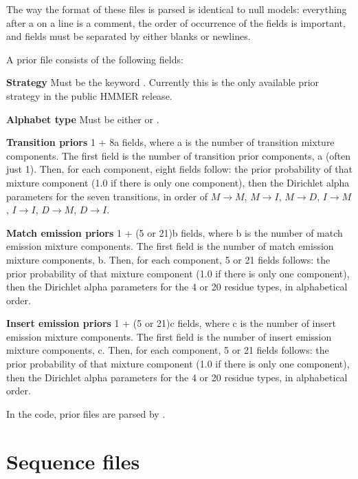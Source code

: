 The way the format of these files is parsed is identical to null
models: everything after a \prog{\#} on a line is a comment, the order
of occurrence of the fields is important, and fields must be separated
by either blanks or newlines.

A prior file consists of the following fields:

\begin{wideitem}
\item [\textbf{Strategy}] Must be the keyword . Currently 
this is the only available prior strategy in the public HMMER release.

\item [\textbf{Alphabet type}] Must be either  or
.

\item [\textbf{Transition priors}] 1 + 8a fields, where a
is the number of transition mixture components. The first field is the
number of transition prior components, a (often just 1). Then, for each
component, eight fields follow: the prior probability of that mixture
component (1.0 if there is only one component), then the Dirichlet
alpha parameters for the seven transitions, in order of $M \rightarrow
M$, $M \rightarrow I$, $M \rightarrow D$, $I \rightarrow M$, $I
\rightarrow I$, $D \rightarrow M$, $D \rightarrow I$.

\item [\textbf{Match emission priors}] 1 + (5 or 21)b fields,
where b is the number of match emission mixture components.  The first
field is the number of match emission mixture components, b. Then, for
each component, 5 or 21 fields follows: the prior probability of that
mixture component (1.0 if there is only one component), then the
Dirichlet alpha parameters for the 4 or 20 residue types, in
alphabetical order.

\item [\textbf{Insert emission priors}] 1 + (5 or 21)c fields,
where c is the number of insert emission mixture components.  The
first field is the number of insert emission mixture components,
c. Then, for each component, 5 or 21 fields follows: the prior
probability of that mixture component (1.0 if there is only one
component), then the Dirichlet alpha parameters for the 4 or 20
residue types, in alphabetical order.
\end{wideitem}

In the code, prior files are parsed by .

\section {Sequence files}

